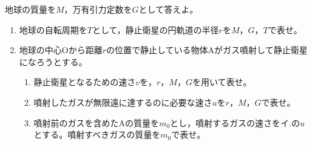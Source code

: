\hakosyokika
\item
    \begin{mawarikomi}{150pt}{}
        地球の質量を$M$，万有引力定数を$G$として答えよ。
        \begin{enumerate}
            \item 地球の自転周期を$T$として，静止衛星の円軌道の半径$r$を$M$，$G$，$T$で表せ。
            \item 地球の中心Oから距離$r$の位置で静止している物体Aがガス噴射して静止衛星になろうとする。
            \begin{enumerate}
                \item 静止衛星となるための速さ$v$を，$r$，$M$，$G$を用いて表せ。
                \item 噴射したガスが無限遠に達するのに必要な速さ$u$を$r$，$M$，$G$で表せ。
                \item 噴射前のガスを含めたAの質量を$m_0$とし，噴射するガスの速さを{\sf イ.}の$u$とする。噴射すべきガスの質量を$m_0$で表せ。
            \end{enumerate}
        \end{enumerate}
    \end{mawarikomi}